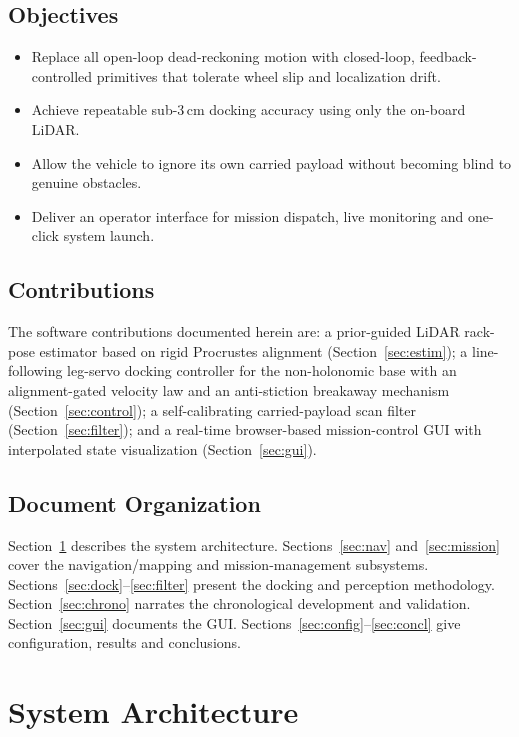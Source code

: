 \documentclass[11pt,a4paper]{article}
\begin{document}
\subsection{Objectives}
\begin{itemize}[leftmargin=1.4em,itemsep=1pt]
  \item Replace all open-loop dead-reckoning motion with closed-loop,
        feedback-controlled primitives that tolerate wheel slip and
        localization drift.
  \item Achieve repeatable sub-3\,cm docking accuracy using only the
        on-board LiDAR.
  \item Allow the vehicle to ignore its own carried payload without becoming
        blind to genuine obstacles.
  \item Deliver an operator interface for mission dispatch, live monitoring
        and one-click system launch.
\end{itemize}

\subsection{Contributions}
The software contributions documented herein are: a prior-guided LiDAR
rack-pose estimator based on rigid Procrustes alignment
(Section~\ref{sec:estim}); a line-following leg-servo docking controller for
the non-holonomic base with an
alignment-gated velocity law and an anti-stiction breakaway mechanism
(Section~\ref{sec:control}); a self-calibrating carried-payload scan filter
(Section~\ref{sec:filter}); and a real-time browser-based mission-control GUI
with interpolated state visualization (Section~\ref{sec:gui}).

\subsection{Document Organization}
Section~\ref{sec:arch} describes the system architecture. Sections~\ref{sec:nav}
and~\ref{sec:mission} cover the navigation/mapping and mission-management
subsystems. Sections~\ref{sec:dock}--\ref{sec:filter} present the docking and
perception methodology. Section~\ref{sec:chrono} narrates the chronological
development and validation. Section~\ref{sec:gui} documents the GUI.
Sections~\ref{sec:config}--\ref{sec:concl} give configuration, results and
conclusions.

\section{System Architecture}\label{sec:arch}
\end{document}
